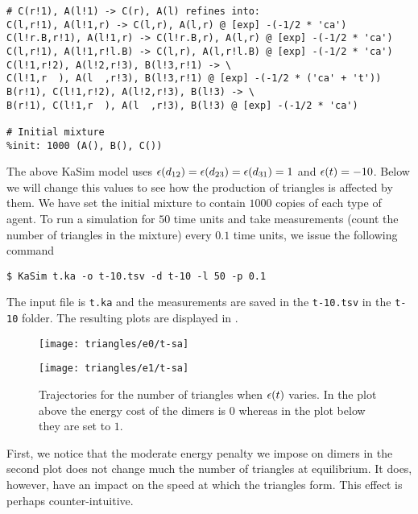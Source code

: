 \begin{lstlisting}
# C(r!1), A(l!1) -> C(r), A(l) refines into:
C(l,r!1), A(l!1,r) -> C(l,r), A(l,r) @ [exp] -(-1/2 * 'ca')
C(l!r.B,r!1), A(l!1,r) -> C(l!r.B,r), A(l,r) @ [exp] -(-1/2 * 'ca')
C(l,r!1), A(l!1,r!l.B) -> C(l,r), A(l,r!l.B) @ [exp] -(-1/2 * 'ca')
C(l!1,r!2), A(l!2,r!3), B(l!3,r!1) -> \
C(l!1,r  ), A(l  ,r!3), B(l!3,r!1) @ [exp] -(-1/2 * ('ca' + 't'))
B(r!1), C(l!1,r!2), A(l!2,r!3), B(l!3) -> \
B(r!1), C(l!1,r  ), A(l  ,r!3), B(l!3) @ [exp] -(-1/2 * 'ca')

# Initial mixture
%init: 1000 (A(), B(), C())
\end{lstlisting}

The above KaSim model uses
$\epsilon(d_{12}) = \epsilon(d_{23}) = \epsilon(d_{31}) = 1$
and $\epsilon(t) = -10$.
Below we will change this values to see how
the production of triangles is affected by them.
We have set the initial mixture to contain
$1000$ copies of each type of agent.
To run a simulation for $50$ time units
and take measurements
(\ie count the number of triangles in the mixture)
every $0.1$ time units,
we issue the following command
\begin{lstlisting}[numbers=none]
$ KaSim t.ka -o t-10.tsv -d t-10 -l 50 -p 0.1
\end{lstlisting} %
The input file is \lstinline|t.ka| and
the measurements are saved in the \lstinline|t-10.tsv|
in the \lstinline|t-10| folder.
The resulting plots are displayed in \fig{triangles}.

\begin{figure}
  \begin{center}
    \texttt{[image: triangles/e0/t-sa]}
  \end{center}
  \begin{center}
    \texttt{[image: triangles/e1/t-sa]}
  \end{center}
  \caption{
    Trajectories for the number of triangles when $\epsilon(t)$ varies.
    In the plot above the energy cost of the dimers is $0$
    whereas in the plot below they are set to $1$.}
  \label{fig:triangles}
\end{figure}

First, we notice that the moderate energy penalty
we impose on dimers in the second plot does not change much
the number of triangles at equilibrium.
It does, however, have an impact
on the speed at which the triangles form.
This effect is perhaps counter-intuitive.

